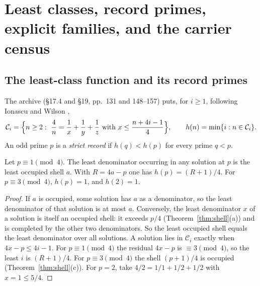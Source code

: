 \section{Least classes, record primes, explicit families, and the carrier census}\label{sec:families}

\subsection{The least-class function and its record primes}\label{ssec:records}

The archive (§17.4 and §19, pp.~131 and 148--157) puts, for $i\ge1$, following Ionascu and Wilson \cite{IonascuWilson},
\[
\mathcal C_i=\Bigl\{n\ge2:\ \frac4n=\frac1x+\frac1y+\frac1z\ \text{with } x\le\frac{n+4i-1}4\Bigr\},\qquad h(n)=\min\{i:n\in\mathcal C_i\}.
\]
An odd prime $p$ is a \emph{strict record} if $h(q)<h(p)$ for every prime $q<p$.

\begin{lemma}\label{lem:leastclass}
Let $p\equiv1\pmod4$. The least denominator occurring in any solution at $p$ is the least occupied shell $a$. With $R=4a-p$ one has $h(p)=(R+1)/4$. For $p\equiv3\pmod4$, $h(p)=1$, and $h(2)=1$.
\end{lemma}
\begin{proof}
If $a$ is occupied, some solution has $a$ as a denominator, so the least denominator of that solution is at most $a$. Conversely, the least denominator $x$ of a solution is itself an occupied shell: it exceeds $p/4$ (Theorem~\ref{thm:shell}(a)) and is completed by the other two denominators. So the least occupied shell equals the least denominator over all solutions. A solution lies in $\mathcal C_i$ exactly when $4x-p\le4i-1$. For $p\equiv1\pmod4$ the residual $4x-p$ is $\equiv3\pmod4$, so the least $i$ is $(R+1)/4$. For $p\equiv3\pmod4$ the shell $(p+1)/4$ is occupied (Theorem~\ref{thm:shell}(c)). For $p=2$, take $4/2=1/1+1/2+1/2$ with $x=1\le5/4$.
\end{proof}

